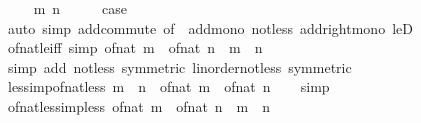 \begin{isabellebody}
\isamarkupfalse%
\isanewline
\ \ \isamarkupfalse%
\ {\isacharparenleft}{\kern0pt}{}\ m\ n{\isacharparenright}{\kern0pt}\isanewline
\ \ \isamarkupfalse%
\ \isamarkupfalse%
\ {\isacharquery}{\kern0pt}case\isanewline
\ \ \ \ \isamarkupfalse%
\ {\isacharparenleft}{\kern0pt}auto\ simp{\isacharcolon}{\kern0pt}\ add{\isacharunderscore}{\kern0pt}commute\ {\isacharbrackleft}{\kern0pt}of\ {}{\isacharbrackright}{\kern0pt}\ add{\isacharunderscore}{\kern0pt}mono{}\ not{\isacharunderscore}{\kern0pt}less\ add{\isacharunderscore}{\kern0pt}right{\isacharunderscore}{\kern0pt}mono\ leD{\isacharparenright}{\kern0pt}\isanewline
{}\isamarkupfalse%
%
\endisatagproof
{\isafoldproof}%
%
\isadelimproof
\isanewline
%
\endisadelimproof
\isanewline
{}\isamarkupfalse%
\ of{\isacharunderscore}{\kern0pt}nat{\isacharunderscore}{\kern0pt}le{\isacharunderscore}{\kern0pt}iff\ {\isacharbrackleft}{\kern0pt}simp{\isacharbrackright}{\kern0pt}{\isacharcolon}{\kern0pt}\ {\isachardoublequoteopen}of{\isacharunderscore}{\kern0pt}nat\ m\ {\isasymle}\ of{\isacharunderscore}{\kern0pt}nat\ n\ {\isasymlongleftrightarrow}\ m\ {\isasymle}\ n{\isachardoublequoteclose}\isanewline
%
\isadelimproof
\ \ %
\endisadelimproof
%
\isatagproof
{}\isamarkupfalse%
\ {\isacharparenleft}{\kern0pt}simp\ add{\isacharcolon}{\kern0pt}\ not{\isacharunderscore}{\kern0pt}less\ {\isacharbrackleft}{\kern0pt}symmetric{\isacharbrackright}{\kern0pt}\ linorder{\isacharunderscore}{\kern0pt}not{\isacharunderscore}{\kern0pt}less\ {\isacharbrackleft}{\kern0pt}symmetric{\isacharbrackright}{\kern0pt}{\isacharparenright}{\kern0pt}%
\endisatagproof
{\isafoldproof}%
%
\isadelimproof
\isanewline
%
\endisadelimproof
\isanewline
{}\isamarkupfalse%
\ less{\isacharunderscore}{\kern0pt}imp{\isacharunderscore}{\kern0pt}of{\isacharunderscore}{\kern0pt}nat{\isacharunderscore}{\kern0pt}less{\isacharcolon}{\kern0pt}\ {\isachardoublequoteopen}m\ {\isacharless}{\kern0pt}\ n\ {\isasymLongrightarrow}\ of{\isacharunderscore}{\kern0pt}nat\ m\ {\isacharless}{\kern0pt}\ of{\isacharunderscore}{\kern0pt}nat\ n{\isachardoublequoteclose}\isanewline
%
\isadelimproof
\ \ %
\endisadelimproof
%
\isatagproof
{}\isamarkupfalse%
\ simp%
\endisatagproof
{\isafoldproof}%
%
\isadelimproof
\isanewline
%
\endisadelimproof
\isanewline
{}\isamarkupfalse%
\ of{\isacharunderscore}{\kern0pt}nat{\isacharunderscore}{\kern0pt}less{\isacharunderscore}{\kern0pt}imp{\isacharunderscore}{\kern0pt}less{\isacharcolon}{\kern0pt}\ {\isachardoublequoteopen}of{\isacharunderscore}{\kern0pt}nat\ m\ {\isacharless}{\kern0pt}\ of{\isacharunderscore}{\kern0pt}nat\ n\ {\isasymLongrightarrow}\ m\ {\isacharless}{\kern0pt}\ n{\isachardoublequoteclose}\isanewline

\end{isabellebody}
